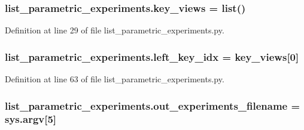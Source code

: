 \subsubsection[{\texorpdfstring{key\+\_\+views}{key_views}}]{\setlength{\rightskip}{0pt plus 5cm}list\+\_\+parametric\+\_\+experiments.\+key\+\_\+views = list()}\hypertarget{namespacelist__parametric__experiments_add5737d5d93dd9d5ef1132a487f0d38c}{}\label{namespacelist__parametric__experiments_add5737d5d93dd9d5ef1132a487f0d38c}


Definition at line 29 of file list\+\_\+parametric\+\_\+experiments.\+py.

\subsubsection[{\texorpdfstring{left\+\_\+key\+\_\+idx}{left_key_idx}}]{\setlength{\rightskip}{0pt plus 5cm}list\+\_\+parametric\+\_\+experiments.\+left\+\_\+key\+\_\+idx = {\bf key\+\_\+views}\mbox{[}0\mbox{]}}\hypertarget{namespacelist__parametric__experiments_a3e09df737302b64ffee8f20434d4648b}{}\label{namespacelist__parametric__experiments_a3e09df737302b64ffee8f20434d4648b}


Definition at line 63 of file list\+\_\+parametric\+\_\+experiments.\+py.

\subsubsection[{\texorpdfstring{out\+\_\+experiments\+\_\+filename}{out_experiments_filename}}]{\setlength{\rightskip}{0pt plus 5cm}list\+\_\+parametric\+\_\+experiments.\+out\+\_\+experiments\+\_\+filename = sys.\+argv\mbox{[}5\mbox{]}}\hypertarget{namespacelist__parametric__experiments_ae91646ce20b8406b5e1b06ca8ab4e134}{}\label{namespacelist__parametric__experiments_ae91646ce20b8406b5e1b06ca8ab4e134}


